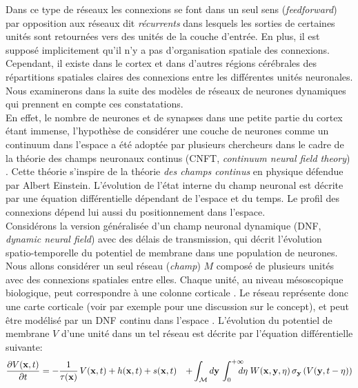 Dans ce type de réseaux les connexions se font dans un seul sens (\textit{feedforward}) par opposition aux réseaux dit \textit{récurrents} \cite{McCulloch:1943} dans lesquels les sorties de certaines unités sont retournées vers des unités de la couche d'entrée. En plus, il est supposé implicitement qu'il n'y a pas d'organisation spatiale des connexions. Cependant, il existe dans le cortex et dans d'autres régions cérébrales des répartitions spatiales claires des connexions entre les différentes unités neuronales. Nous examinerons dans la suite des modèles de réseaux de neurones dynamiques qui prennent en compte ces constatations.\\

En effet, le nombre de neurones et de synapses dans une petite partie du cortex étant immense, l'hypothèse de considérer une couche de neurones comme un continuum dans l'espace a été adoptée par plusieurs chercheurs dans le cadre de la théorie des champs neuronaux continus (CNFT, \textit{continuum neural field theory}) \cite{Wilson:1973, Amari:1977}. Cette théorie s'inspire de la théorie \textit{des champs continus} en physique défendue par Albert Einstein. L'évolution de l'état interne du champ neuronal est décrite par une équation différentielle dépendant de l'espace et du temps. Le profil des connexions dépend lui aussi du positionnement dans l'espace.\\

Considérons la version généralisée d'un champ neuronal dynamique (DNF, \textit{dynamic neural field}) avec des délais de transmission, qui décrit l'évolution spatio-temporelle du potentiel de membrane dans une population de neurones. Nous allons considérer un seul réseau (\textit{champ}) $M$ composé de plusieurs unités avec des connexions spatiales entre elles. Chaque unité, au niveau mésoscopique biologique, peut correspondre à une colonne corticale \cite{Chemla:2007}. Le réseau représente donc une carte corticale (voir par exemple \cite{Vieville:2007} pour une discussion sur le concept), et peut être modélisé par un DNF continu dans l'espace \cite{Wilson:1973, Taylor:1999, Amari:1977}. L'évolution du potentiel de membrane $ V $ d'une unité dans un tel réseau est décrite par l'équation différentielle suivante:\\
\begin{align}
  \label{eq: DNF-continuous}
  & \frac{\partial V(\mathbf{x},t)}{\partial t} =
  -\frac{1}{\tau(\mathbf{x})} \, V(\mathbf{x},t) + h(\mathbf{x}, t) + s(\mathbf{x}, t) 
  &+ \int_{\cal M} d \mathbf{y} \, \int_0^{+\infty} \, \hspace{-1em} d \eta \; W(\mathbf{x}, \mathbf{y}, \eta) \, \sigma_{\mathbf{y}}\left(V(\mathbf{y}, t - \eta)\right) 
\end{align}

